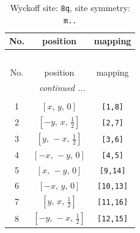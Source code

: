 \documentclass[fleqn,8pt]{jsarticle}
\begin{document}
\begin{longtable}{ccc}
\caption{Wyckoff site: {\tt 8q}, site symmetry: {\tt m..}}
 \\
 \hline \hline
No. & position & mapping \\ \hline \endfirsthead

\multicolumn{2}{l}{\tablename\ \thetable{}} \\
 \hline \hline
No. & position & mapping \\ \hline \endhead

 \hline \hline
\multicolumn{2}{r}{\footnotesize\it continued ...} \\ \endfoot

 \hline \hline
\multicolumn{2}{r}{} \\ \endlastfoot

1 & $\left[ x,\, y,\, 0 \right]$ & {\tt [1,8]} \\ \hline
2 & $\left[ - y,\, x,\, \frac{1}{2} \right]$ & {\tt [2,7]} \\ \hline
3 & $\left[ y,\, - x,\, \frac{1}{2} \right]$ & {\tt [3,6]} \\ \hline
4 & $\left[ - x,\, - y,\, 0 \right]$ & {\tt [4,5]} \\ \hline
5 & $\left[ x,\, - y,\, 0 \right]$ & {\tt [9,14]} \\ \hline
6 & $\left[ - x,\, y,\, 0 \right]$ & {\tt [10,13]} \\ \hline
7 & $\left[ y,\, x,\, \frac{1}{2} \right]$ & {\tt [11,16]} \\ \hline
8 & $\left[ - y,\, - x,\, \frac{1}{2} \right]$ & {\tt [12,15]} \\
\end{longtable}
\renewcommand{\arraystretch}{1.2}
\end{document}
